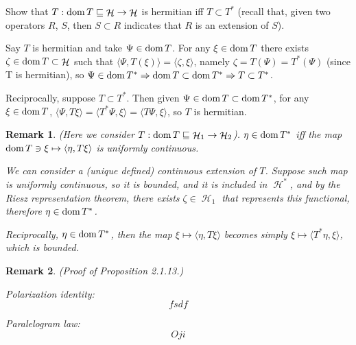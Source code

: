 \documentclass{article}
\theoremstyle{exercisestyle}
\newenvironment{exercise}[1]
  {\renewcommand\theinnerex{#1}\innerex}
  {\endinnerex}
\newtheorem{remark}{Remark}[subsection]
\DeclareMathOperator{\hilbert}{\mathcal{H}}
\newcommand{\inner}[2]{\langle #1, #2 \rangle}
\begin{document}
\begin{exercise}{2.1.3} Show that $T : \dom T \sqsubseteq \hilbert \to \hilbert$ is hermitian iff $T \subset T^{*}$ (recall
    that, given two operators $R$, $S$, then $S \subset R$ indicates that $R$ is an extension of $S$).

    Say $T$ is hermitian and take $\Psi \in \operatorname{dom} T$. For any $\xi \in \operatorname{dom} T$ there exists $\zeta \in \dom T \subset \hilbert$ such that $ \inner{\Psi}{T(\xi)} = \inner{\zeta}{\xi}$,
    namely $\zeta = T(\Psi) = T^* (\Psi)$ (since T is hermitian), so $\Psi \in \operatorname{dom} T^* \Rightarrow \operatorname{dom} T \subset \operatorname{dom} T^* \Rightarrow T \subset T^*$.

    Reciprocally, suppose $T \subset T^*$. Then given $\Psi \in \operatorname{dom} T \subset \operatorname{dom} T^*$, for any $\xi \in \operatorname{dom} T$, $\inner{\Psi}{T \xi} = \inner{T^* \Psi}{\xi} = \inner{T \Psi}{\xi}$,
    so $T$ is hermitian.

\end{exercise}

\begin{remark}
    (Here we consider $T: \dom T \sqsubseteq \hilbert_1 \to \hilbert_2$). $\eta \in \operatorname{dom} T^*$ iff the map $\dom T \ni \xi \mapsto \inner{\eta}{T \xi}$ is uniformly continuous.

    We can consider a (unique defined) continuous extension of $T$. Suppose such map is uniformly continuous, so it is bounded, and it is included in $\hilbert^*$, and by the Riesz
    representation theorem, there exists $\zeta \in \hilbert_1$ that represents this functional, therefore $\eta \in \operatorname{dom} T^*$.

    Reciprocally, $\eta \in \operatorname{dom} T^*$, then the map $\xi \mapsto \inner{\eta}{T \xi}$ becomes simply $\xi \mapsto \inner{T^* \eta}{\xi}$, which is bounded.


\end{remark}

\begin{remark}
    (Proof of Proposition 2.1.13.)

    Polarization identity:
    $$ fsdf $$

    Paralelogram law:
    $$ Oji $$
\end{remark}
\end{document}
